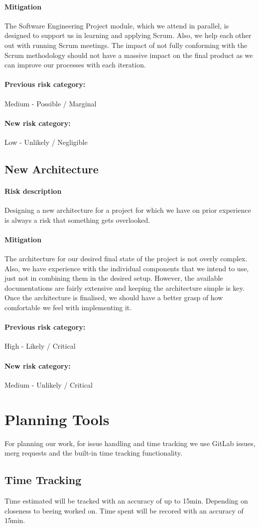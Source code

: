 \paragraph{Mitigation} The Software Engineering Project module, which we attend in parallel, is designed to support us in learning and applying Scrum. Also, we help each other out with running Scrum meetings. The impact of not fully conforming with the Scrum methodology should not have a massive impact on the final product as we can improve our processes with each iteration.
\paragraph{Previous risk category:} Medium - Possible / Marginal
\paragraph{New risk category:} Low - Unlikely / Negligible

\subsection{New Architecture}
\paragraph{Risk description} Designing a new architecture for a project for which we have on prior experience is always a risk that something gets overlooked.
\paragraph{Mitigation} The architecture for our desired final state of the project is not overly complex. Also, we have experience with the individual components that we intend to use, just not in combining them in the desired setup. However, the available documentations are fairly extensive and keeping the architecture simple is key. Once the architecture is finalised, we should have a better grasp of how comfortable we feel with implementing it.
\paragraph{Previous risk category:} High - Likely / Critical
\paragraph{New risk category:} Medium - Unlikely / Critical


\section{Planning Tools}
For planning our work, for issue handling and time tracking we use GitLab issues, merg requests and the built-in time tracking functionality.

\subsection{Time Tracking}
Time estimated will be tracked with an accuracy of up to 15min. Depending on closeness to beeing worked on.
Time spent will be recored with an accuracy of 15min.
